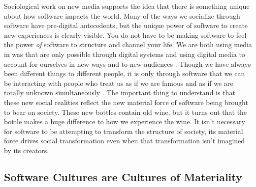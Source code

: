 \documentclass[a4paper,man,natbib]{apa6}
\begin{document}
  Sociological work on new media supports the idea that there is something unique about how software impacts the world. Many of the ways we socialize through software have pre-digital antecedents, but the unique power of software to create new experiences is clearly visible. You do not have to be making software to feel the power \textit{of} software to structure and channel your life. We are both using media in was that are only possible through digital systems and using digital media to account for ourselves in new ways and to new audiences \citep{Humphreys2018-ge,Jurgenson2019-tl}. Though we have always been different things to different people, it is only through software that we can be interacting with people who treat us as if we are famous and as if we are totally unknown simultaneously \citep{Dean2010-lk}. The important thing to understand is that these new social realities reflect the new material force of software being brought to bear on society. These new bottles contain old wine, but it turns out that the bottle makes a huge difference to how we experience the wine. It isn't necessary for software to be attempting to transform the structure of society, its material force drives social transformation even when that transformation isn't imagined by its creators. 


  \subsection*{Software Cultures are Cultures of Materiality}
\end{document}
